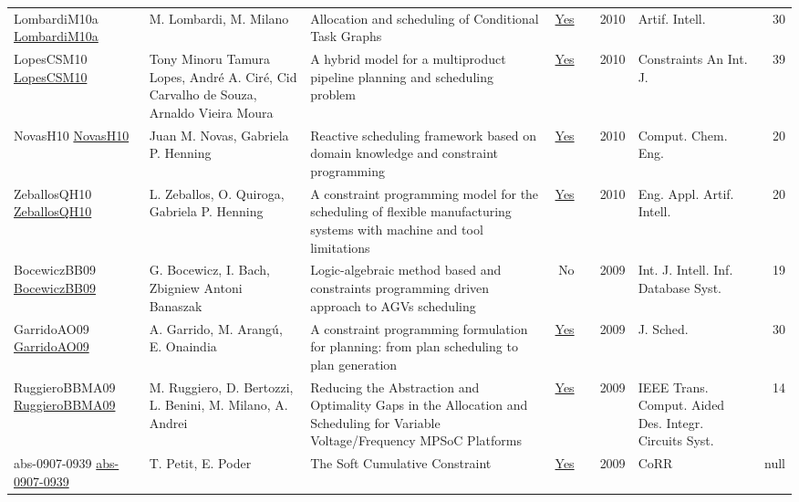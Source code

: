 {\begin{longtable}{p{3cm}p{6cm}p{7cm}rrrp{3cm}r}
LombardiM10a \href{https://doi.org/10.1016/j.artint.2010.02.004}{LombardiM10a} & M. Lombardi, M. Milano & Allocation and scheduling of Conditional Task Graphs & \href{articles/LombardiM10a.pdf}{Yes} & \cite{LombardiM10a} & 2010 & Artif. Intell. & 30\\
LopesCSM10 \href{https://doi.org/10.1007/s10601-009-9086-z}{LopesCSM10} & Tony Minoru Tamura Lopes, Andr{\'{e}} A. Cir{\'{e}}, Cid Carvalho de Souza, Arnaldo Vieira Moura & A hybrid model for a multiproduct pipeline planning and scheduling problem & \href{articles/LopesCSM10.pdf}{Yes} & \cite{LopesCSM10} & 2010 & Constraints An Int. J. & 39\\
NovasH10 \href{https://doi.org/10.1016/j.compchemeng.2010.07.011}{NovasH10} & Juan M. Novas, Gabriela P. Henning & Reactive scheduling framework based on domain knowledge and constraint programming & \href{articles/NovasH10.pdf}{Yes} & \cite{NovasH10} & 2010 & Comput. Chem. Eng. & 20\\
ZeballosQH10 \href{https://doi.org/10.1016/j.engappai.2009.07.002}{ZeballosQH10} & L. Zeballos, O. Quiroga, Gabriela P. Henning & A constraint programming model for the scheduling of flexible manufacturing systems with machine and tool limitations & \href{articles/ZeballosQH10.pdf}{Yes} & \cite{ZeballosQH10} & 2010 & Eng. Appl. Artif. Intell. & 20\\
BocewiczBB09 \href{https://doi.org/10.1504/IJIIDS.2009.023038}{BocewiczBB09} & G. Bocewicz, I. Bach, Zbigniew Antoni Banaszak & Logic-algebraic method based and constraints programming driven approach to AGVs scheduling & No & \cite{BocewiczBB09} & 2009 & Int. J. Intell. Inf. Database Syst. & 19\\
GarridoAO09 \href{https://doi.org/10.1007/s10951-008-0083-7}{GarridoAO09} & A. Garrido, M. Arang{\'{u}}, E. Onaindia & A constraint programming formulation for planning: from plan scheduling to plan generation & \href{articles/GarridoAO09.pdf}{Yes} & \cite{GarridoAO09} & 2009 & J. Sched. & 30\\
RuggieroBBMA09 \href{https://doi.org/10.1109/TCAD.2009.2013536}{RuggieroBBMA09} & M. Ruggiero, D. Bertozzi, L. Benini, M. Milano, A. Andrei & Reducing the Abstraction and Optimality Gaps in the Allocation and Scheduling for Variable Voltage/Frequency MPSoC Platforms & \href{articles/RuggieroBBMA09.pdf}{Yes} & \cite{RuggieroBBMA09} & 2009 & {IEEE} Trans. Comput. Aided Des. Integr. Circuits Syst. & 14\\
abs-0907-0939 \href{http://arxiv.org/abs/0907.0939}{abs-0907-0939} & T. Petit, E. Poder & The Soft Cumulative Constraint & \href{articles/abs-0907-0939.pdf}{Yes} & \cite{abs-0907-0939} & 2009 & CoRR & null\\

\end{longtable}}
